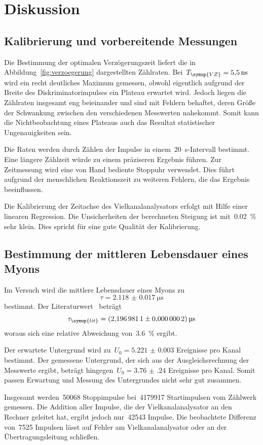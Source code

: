 \section{Diskussion}
\label{sec:diskussion}

\subsection{Kalibrierung und vorbereitende Messungen}

Die Bestimmung der optimalen Verzögerungszeit liefert die in
Abbildung~\ref{fig:verzoegerung} dargestellten Zählraten.
Bei~$T_{\symup{VZ}}=\SI{5.5}{\nano\second}$ wird ein recht deutliches Maximum
gemessen, obwohl eigentlich aufgrund der Breite des Diskriminatorimpulses ein
Plateau erwartet wird. Jedoch liegen die Zählraten insgesamt eng beieinander
und sind mit Fehlern behaftet, deren Größe der Schwankung zwischen den
verschiedenen Messwerten nahekommt. Somit kann die Nichtbeobachtung eines
Plateaus auch das Resultat statistischer Ungenauigkeiten sein.

Die Raten werden durch Zählen der Impulse in einem~\SI{20}{\second}-Intervall
bestimmt. Eine längere Zählzeit würde zu einem präziseren Ergebnis führen.
Zur Zeitmessung wird eine von Hand bediente Stoppuhr verwendet. Dies führt
aufgrund der menschlichen Reaktionszeit zu weiteren Fehlern, die das Ergebnis
beeinflussen.

Die Kalibrierung der Zeitachse des Vielkanalanalysators erfolgt mit Hilfe einer
linearen Regression. Die Unsicherheiten der berechneten Steigung ist
mit~\SI{0.02}{\percent} sehr klein. Dies spricht für eine gute Qualität der
Kalibrierung.

\subsection{Bestimmung der mittleren Lebensdauer eines Myons}

Im Versuch wird die mittlere Lebensdauer eines Myons zu
%
\begin{equation}
  \tau=\SI{2.118(17)}{\micro\second}
\end{equation}
%
bestimmt. Der Literaturwert~\cite[14]{pdg} beträgt
%
\begin{equation}
  \tau_{\symup{lit}}=\SI{2.1969811(2)}{\micro\second}
\end{equation}
%
woraus sich eine relative Abweichung von~\SI{3.6}{\percent} ergibt.

Der erwartete Untergrund wird zu~$U_0=\num{5.221(3)}$ Ereignisse pro Kanal
bestimmt. Der gemessene Untergrund, der sich aus der Ausgleichsrechnung der
Messwerte ergibt, beträgt hingegen~$U_0=\num{3.76(24)}$ Ereignisse pro Kanal.
Somit passen Erwartung und Messung des Untergrundes nicht sehr gut zusammen.

Insgesamt werden~\num{50068} Stoppimpulse bei~\num{4179917} Startimpulsen
vom Zählwerk gemessen. Die Addition aller Impulse, die der Vielkanalanalysator
an den Rechner geleitet hat, ergibt jedoch nur~\num{42543} Impulse. Die
beobachtete Differenz von~\num{7525} Impulsen lässt auf Fehler am
Vielkanalanalysator oder an der Übertragungsleitung schließen.
